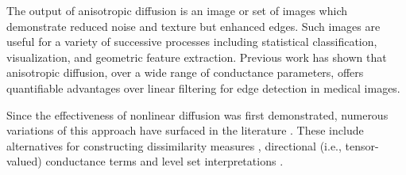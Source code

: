 The output of anisotropic diffusion is an image or set of images which
demonstrate reduced noise and texture but enhanced edges.  Such images are
useful for a variety of successive processes including statistical
classification, visualization, and geometric feature extraction.  Previous work
has shown \cite{Whitaker-thesis} that anisotropic diffusion, over a wide range
of conductance parameters, offers quantifiable advantages over linear filtering
for edge detection in medical images.  

Since the effectiveness of nonlinear diffusion was first demonstrated, numerous
variations of this approach have surfaced in the literature \cite{Romeny1994}.
These include alternatives for constructing dissimilarity measures
\cite{Sapiro1996}, directional (i.e., tensor-valued) conductance terms
\cite{Weickert1996,Alvarez1994} and level set interpretations
\cite{Whitaker2001}.
